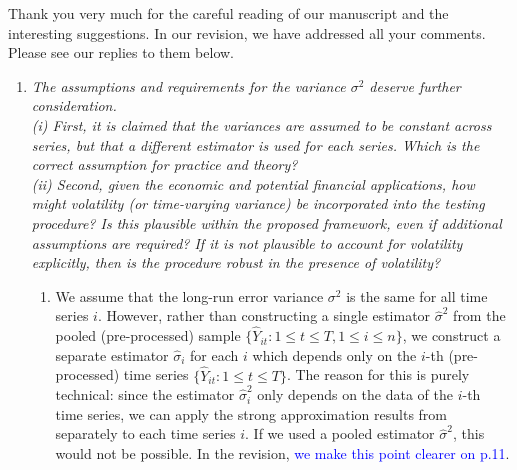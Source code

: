 \documentclass[a4paper,12pt]{article}
\begin{document}
Thank you very much for the careful reading of our manuscript and the interesting suggestions. In our revision, we have addressed all your comments. Please see our replies to them below.
\begin{enumerate}[label=\arabic*.,leftmargin=0.6cm]


\item \textit{The assumptions and requirements for the variance $\sigma^2$ deserve further consideration. \\
(i) First, it is claimed that the variances are assumed to be constant across series, but that a different estimator is used for each series. Which is the correct assumption for practice and theory? \\
(ii) Second, given the economic and potential financial applications, how might volatility (or time-varying variance) be incorporated into the testing procedure? Is this plausible within the proposed framework, even if additional assumptions are required? If it is not plausible to account for volatility explicitly, then is the procedure robust in the presence of volatility? }

\begin{enumerate}[label=(\roman*),leftmargin=0.75cm,topsep=0pt]

\item We assume that the long-run error variance $\sigma^2$ is the same for all time series $i$. However, rather than constructing a single estimator $\hat{\sigma}^2$ from the pooled (pre-processed) sample $\{ \widehat{Y}_{it}: 1 \le t \le T, 1 \le i \le n \}$, we construct a separate estimator $\hat{\sigma}_i$ for each $i$ which depends only on the $i$-th (pre-processed) time series $\{ \widehat{Y}_{it}: 1 \le t \le T\}$. The reason for this is purely technical: since the estimator $\hat{\sigma}_i^2$ only depends on the data of the $i$-th time series, we can apply the strong approximation results from \cite{BerkesLiuWu2014} separately to each time series $i$. If we used a pooled estimator $\hat{\sigma}^2$, this would not be possible. 
In the revision, \textcolor{blue}{we make this point clearer on p.11}.


\end{enumerate}
\end{enumerate}
\end{document}
